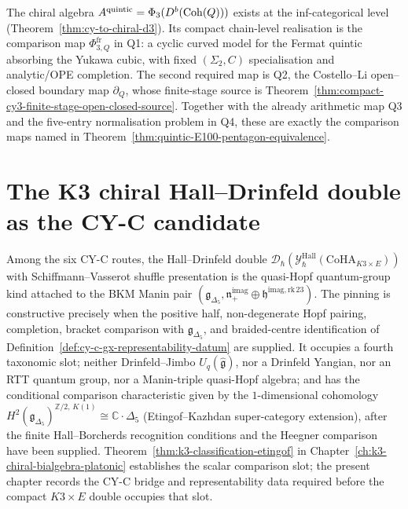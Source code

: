 \begin{remark}
\label{rem:quintic-CY-A-3-compact-scope}
The chiral algebra $A^{\mathrm{quintic}} = \Phi_3(D^b(\mathrm{Coh}(Q)))$
exists at the inf-categorical level
\textup{(}Theorem~\ref{thm:cy-to-chiral-d3}\textup{).} Its compact
chain-level realisation is the comparison map
$\Phi_{3,Q}^{\mathrm{fr}}$ in \textup{Q1}: a cyclic curved model for
the Fermat quintic absorbing the Yukawa cubic, with fixed
$(\Sigma_2,C)$ specialisation and analytic/OPE completion. The
second required map is \textup{Q2}, the Costello--Li open--closed
boundary map $\partial_Q$, whose finite-stage source is
Theorem~\ref{thm:compact-cy3-finite-stage-open-closed-source}. Together
with the already arithmetic map \textup{Q3} and the five-entry
normalisation problem in \textup{Q4}, these are exactly the comparison
maps named in Theorem~\ref{thm:quintic-E100-pentagon-equivalence}.
\end{remark}

\section{The K3 chiral Hall--Drinfeld double as the CY-C candidate}
\label{sec:cy-c-six-routes-hd-double}

\begin{remark}
\label{rem:cy-c-six-routes-hall-drinfeld}
Among the six CY-C routes, the Hall--Drinfeld double
$\mathcal{D}_\hbar(\mathcal{Y}^{\mathrm{Hall}}_\hbar(\mathrm{CoHA}_{K3\times E}))$
with Schiffmann--Vasserot shuffle presentation is the
quasi-Hopf quantum-group kind attached to the BKM Manin pair
$(\mathfrak{g}_{\Delta_5},\mathfrak{n}_+^{\mathrm{imag}}\oplus\mathfrak{h}^{\mathrm{imag,rk\,23}})$.
The pinning is constructive precisely when the positive half,
non-degenerate Hopf pairing, completion, bracket comparison with
$\mathfrak{g}_{\Delta_5}$, and braided-centre identification of
Definition~\ref{def:cy-c-gx-representability-datum} are supplied.
It occupies a fourth taxonomic slot; neither Drinfeld--Jimbo
$U_q(\widehat{\mathfrak{g}})$, nor a Drinfeld Yangian, nor an RTT
quantum group, nor a Manin-triple quasi-Hopf algebra; and has the
conditional comparison characteristic given by the $1$-dimensional cohomology
$H^2(\mathfrak{g}_{\Delta_5})^{\mathbb{Z}/2,\,K(1)}
\cong\mathbb{C}\cdot\Delta_5$ (Etingof--Kazhdan super-category
extension), after the finite Hall--Borcherds recognition conditions and the
Heegner comparison have been supplied. Theorem~\ref{thm:k3-classification-etingof}
in Chapter~\ref{ch:k3-chiral-bialgebra-platonic} establishes the scalar comparison slot; the
present chapter records the CY-C bridge and representability data
required before the compact $K3\times E$ double occupies that slot.
\end{remark}

